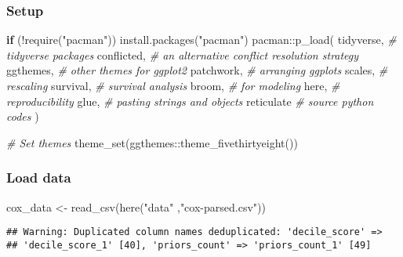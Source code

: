 \documentclass[
]{book}
\newenvironment{Shaded}{\begin{snugshade}}{\end{snugshade}}
\newcommand{\CommentTok}[1]{\textcolor[rgb]{0.56,0.35,0.01}{\textit{#1}}}
\newcommand{\ControlFlowTok}[1]{\textcolor[rgb]{0.13,0.29,0.53}{\textbf{#1}}}
\newcommand{\FunctionTok}[1]{\textcolor[rgb]{0.00,0.00,0.00}{#1}}
\newcommand{\NormalTok}[1]{#1}
\newcommand{\OtherTok}[1]{\textcolor[rgb]{0.56,0.35,0.01}{#1}}
\newcommand{\SpecialCharTok}[1]{\textcolor[rgb]{0.00,0.00,0.00}{#1}}
\newcommand{\StringTok}[1]{\textcolor[rgb]{0.31,0.60,0.02}{#1}}
\begin{document}
\hypertarget{setup-9}{%
\subsubsection{Setup}\label{setup-9}}

\begin{Shaded}
\begin{Highlighting}[]
\ControlFlowTok{if}\NormalTok{ (}\SpecialCharTok{!}\FunctionTok{require}\NormalTok{(}\StringTok{"pacman"}\NormalTok{)) }\FunctionTok{install.packages}\NormalTok{(}\StringTok{"pacman"}\NormalTok{)}
\NormalTok{pacman}\SpecialCharTok{::}\FunctionTok{p\_load}\NormalTok{(}
\NormalTok{ tidyverse, }\CommentTok{\# tidyverse packages }
\NormalTok{ conflicted, }\CommentTok{\# an alternative conflict resolution strategy }
\NormalTok{ ggthemes, }\CommentTok{\# other themes for ggplot2 }
\NormalTok{ patchwork, }\CommentTok{\# arranging ggplots}
\NormalTok{ scales, }\CommentTok{\# rescaling }
\NormalTok{ survival, }\CommentTok{\# survival analysis}
\NormalTok{ broom, }\CommentTok{\# for modeling}
\NormalTok{ here, }\CommentTok{\# reproducibility }
\NormalTok{ glue, }\CommentTok{\# pasting strings and objects }
\NormalTok{ reticulate }\CommentTok{\# source python codes}
\NormalTok{)}

\CommentTok{\# Set themes }
\FunctionTok{theme\_set}\NormalTok{(ggthemes}\SpecialCharTok{::}\FunctionTok{theme\_fivethirtyeight}\NormalTok{())}
\end{Highlighting}
\end{Shaded}

\hypertarget{load-data-2}{%
\subsubsection{Load data}\label{load-data-2}}

\begin{Shaded}
\begin{Highlighting}[]
\NormalTok{cox\_data }\OtherTok{\textless{}{-}} \FunctionTok{read\_csv}\NormalTok{(}\FunctionTok{here}\NormalTok{(}\StringTok{"data"}\NormalTok{ ,}\StringTok{"cox{-}parsed.csv"}\NormalTok{))}
\end{Highlighting}
\end{Shaded}

\begin{verbatim}
## Warning: Duplicated column names deduplicated: 'decile_score' =>
## 'decile_score_1' [40], 'priors_count' => 'priors_count_1' [49]
\end{verbatim}
\end{document}
